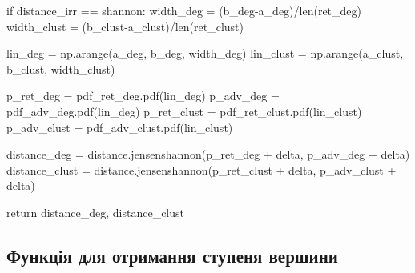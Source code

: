 \documentclass[
  letterpaper,
]{report}
\newenvironment{Shaded}{\begin{snugshade}}{\end{snugshade}}
\newcommand{\BuiltInTok}[1]{\textcolor[rgb]{0.00,0.23,0.31}{#1}}
\newcommand{\ControlFlowTok}[1]{\textcolor[rgb]{0.00,0.23,0.31}{#1}}
\newcommand{\NormalTok}[1]{\textcolor[rgb]{0.00,0.23,0.31}{#1}}
\newcommand{\OperatorTok}[1]{\textcolor[rgb]{0.37,0.37,0.37}{#1}}
\newcommand{\StringTok}[1]{\textcolor[rgb]{0.13,0.47,0.30}{#1}}
\begin{document}
\begin{Shaded}
\begin{Highlighting}[]
    \ControlFlowTok{if}\NormalTok{ distance\_irr }\OperatorTok{==} \StringTok{\textquotesingle{}shannon\textquotesingle{}}\NormalTok{:                                 }
\NormalTok{        width\_deg }\OperatorTok{=}\NormalTok{ (b\_deg}\OperatorTok{{-}}\NormalTok{a\_deg)}\OperatorTok{/}\BuiltInTok{len}\NormalTok{(ret\_deg)}
\NormalTok{        width\_clust }\OperatorTok{=}\NormalTok{ (b\_clust}\OperatorTok{{-}}\NormalTok{a\_clust)}\OperatorTok{/}\BuiltInTok{len}\NormalTok{(ret\_clust)}

\NormalTok{        lin\_deg }\OperatorTok{=}\NormalTok{ np.arange(a\_deg, b\_deg, width\_deg) }
\NormalTok{        lin\_clust }\OperatorTok{=}\NormalTok{ np.arange(a\_clust, b\_clust, width\_clust)}

\NormalTok{        p\_ret\_deg }\OperatorTok{=}\NormalTok{ pdf\_ret\_deg.pdf(lin\_deg) }
\NormalTok{        p\_adv\_deg }\OperatorTok{=}\NormalTok{ pdf\_adv\_deg.pdf(lin\_deg) }
\NormalTok{        p\_ret\_clust }\OperatorTok{=}\NormalTok{ pdf\_ret\_clust.pdf(lin\_clust) }
\NormalTok{        p\_adv\_clust }\OperatorTok{=}\NormalTok{ pdf\_adv\_clust.pdf(lin\_clust)}
    
\NormalTok{        distance\_deg }\OperatorTok{=}\NormalTok{ distance.jensenshannon(p\_ret\_deg }\OperatorTok{+}\NormalTok{ delta, p\_adv\_deg }\OperatorTok{+}\NormalTok{ delta)}
\NormalTok{        distance\_clust }\OperatorTok{=}\NormalTok{ distance.jensenshannon(p\_ret\_clust }\OperatorTok{+}\NormalTok{ delta, p\_adv\_clust }\OperatorTok{+}\NormalTok{ delta)}
      
    \ControlFlowTok{return}\NormalTok{ distance\_deg, distance\_clust}
\end{Highlighting}
\end{Shaded}

\hypertarget{ux444ux443ux43dux43aux446ux456ux44f-ux434ux43bux44f-ux43eux442ux440ux438ux43cux430ux43dux43dux44f-ux441ux442ux443ux43fux435ux43dux44f-ux432ux435ux440ux448ux438ux43dux438}{%
\subsection{Функція для отримання ступеня
вершини}\label{ux444ux443ux43dux43aux446ux456ux44f-ux434ux43bux44f-ux43eux442ux440ux438ux43cux430ux43dux43dux44f-ux441ux442ux443ux43fux435ux43dux44f-ux432ux435ux440ux448ux438ux43dux438}}
\end{document}
